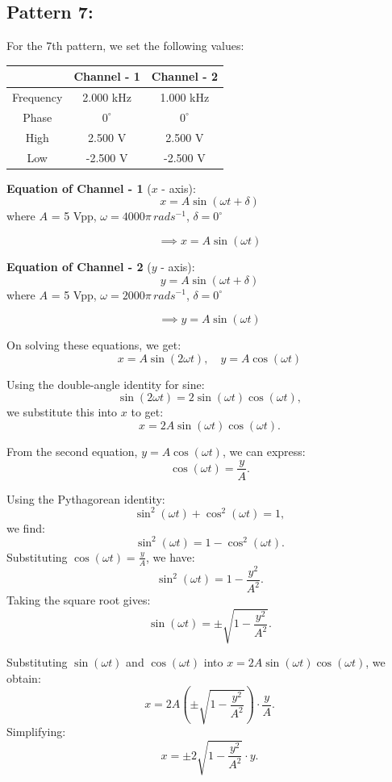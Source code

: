 \documentclass[12pt]{article}
\begin{document}
\subsection{Pattern 7:}
For the 7th pattern, we set the following values:
\begin{table}[H]
    \centering
    \begin{tabular}{|c|c|c|}
    \hline
        & \textbf{Channel - 1} & \textbf{Channel - 2}\\
    \hline
    Frequency & 2.000 kHz & 1.000 kHz\\
    \hline
    Phase     & $0^{\circ}$ & $0^{\circ}$\\
    \hline
    High      & 2.500 V & 2.500 V\\
    \hline
    Low       & -2.500 V & -2.500 V\\
    \hline
    \end{tabular}
\end{table}

\textbf{Equation of Channel - 1} ($x$ - axis):
\[
x = A \sin{\left(\omega t + \delta\right)}
\]
where $A$ = 5 Vpp, $\omega = 4000 \pi \, rad s^{-1}$, $\delta = 0^{\circ}$

\[
\implies x = A \sin{\left(\omega t\right)}
\]

\textbf{Equation of Channel - 2} ($y$ - axis):
\[
y = A \sin{\left(\omega t + \delta\right)}
\]
where $A$ = 5 Vpp, $\omega = 2000 \pi \, rad s^{-1}$, $\delta = 0^{\circ}$

\[
\implies y = A \sin{\left(\omega t\right)}
\]

On solving these equations, we get:
\[
x = A \sin{\left( 2\omega t\right)}, \quad y = A \cos{\left(\omega t\right)}
\]


Using the double-angle identity for sine:
\[
\sin(2\omega t) = 2\sin(\omega t)\cos(\omega t),
\]
we substitute this into \( x \) to get:
\[
x = 2A \sin(\omega t)\cos(\omega t).
\]

From the second equation, \( y = A \cos(\omega t) \), we can express:
\[
\cos(\omega t) = \frac{y}{A}.
\]

Using the Pythagorean identity:
\[
\sin^2(\omega t) + \cos^2(\omega t) = 1,
\]
we find:
\[
\sin^2(\omega t) = 1 - \cos^2(\omega t).
\]
Substituting \( \cos(\omega t) = \frac{y}{A} \), we have:
\[
\sin^2(\omega t) = 1 - \frac{y^2}{A^2}.
\]
Taking the square root gives:
\[
\sin(\omega t) = \pm \sqrt{1 - \frac{y^2}{A^2}}.
\]

Substituting \( \sin(\omega t) \) and \( \cos(\omega t) \) into \( x = 2A \sin(\omega t)\cos(\omega t) \), we obtain:
\[
x = 2A \left( \pm \sqrt{1 - \frac{y^2}{A^2}} \right) \cdot \frac{y}{A}.
\]
Simplifying:
\[
x = \pm 2 \sqrt{1 - \frac{y^2}{A^2}} \cdot y.
\]
\end{document}
